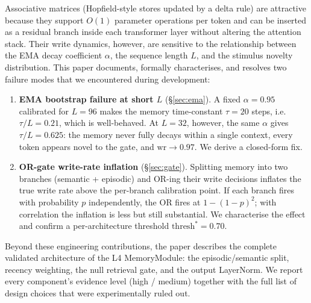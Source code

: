 \documentclass{article}
\begin{document}
Associative matrices (Hopfield-style stores \citep{ramsauer2021hopfield} updated by a
delta rule) are attractive because they support $O(1)$ parameter operations per token
and can be inserted as a residual branch inside each transformer layer without altering
the attention stack.  Their write dynamics, however, are sensitive to the relationship
between the EMA decay coefficient $\alpha$, the sequence length $L$, and the stimulus
novelty distribution.  This paper documents, formally characterises, and resolves two
failure modes that we encountered during development:

\begin{enumerate}
\item \textbf{EMA bootstrap failure at short $L$} (\S\ref{sec:ema}).  A fixed
      $\alpha = 0.95$ calibrated for $L=96$ makes the memory time-constant
      $\tau = 20$ steps, i.e.\ $\tau/L = 0.21$, which is well-behaved.  At $L=32$,
      however, the same $\alpha$ gives $\tau/L = 0.625$: the memory never fully decays
      within a single context, every token appears novel to the gate, and
      $\mathrm{wr} \to 0.97$.  We derive a closed-form fix.

\item \textbf{OR-gate write-rate inflation} (\S\ref{sec:gate}).  Splitting memory into
      two branches (semantic + episodic) and OR-ing their write decisions inflates the
      true write rate above the per-branch calibration point.  If each branch fires with
      probability $p$ independently, the OR fires at $1-(1-p)^2$; with correlation the
      inflation is less but still substantial.  We characterise the effect and confirm a
      per-architecture threshold $\mathrm{thresh}^* = 0.70$.
\end{enumerate}

Beyond these engineering contributions, the paper describes the complete validated
architecture of the L4 MemoryModule: the episodic/semantic split, recency weighting,
the null retrieval gate, and the output LayerNorm.  We report every component's evidence
level (high / medium) together with the full list of design choices that were
experimentally ruled out.
\end{document}
